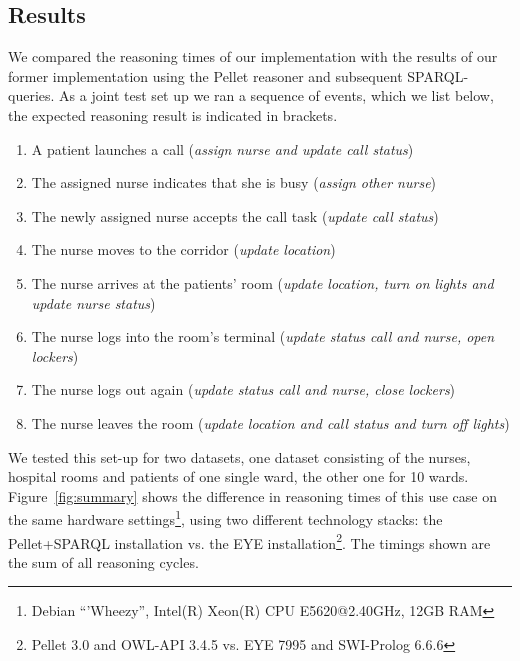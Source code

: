 \subsection{Results}\label{ev}


We compared the reasoning times of our implementation with the results of our former implementation using 
the Pellet reasoner and subsequent SPARQL-queries. 
As a joint test set up we ran a sequence of events, which we list below, the expected reasoning result is indicated in brackets. 

\begin{enumerate}
\item %
A patient launches a call (\emph{assign nurse and update call status})
\item
The assigned nurse indicates that she is busy (\emph{assign other nurse})
\item
The newly assigned nurse accepts the call task (\emph{update call status})
\item %
The nurse moves to the corridor (\emph{update location})
\item %
The nurse arrives at the patients' room (\emph{update location, turn on lights  and update nurse status})
\item %
The nurse logs into the room's terminal (\emph{update status call and nurse, open lockers})
\item %
The nurse logs out again (\emph{update status call and nurse, close lockers})
\item %
The nurse leaves the room (\emph{update location and call status and turn off lights})
\end{enumerate}

We tested this set-up for two datasets, one dataset consisting of the nurses, hospital rooms and patients of one single ward, the other one for 10 wards.
Figure~\ref{fig:summary} shows the difference in reasoning times of this use case on the same hardware settings\footnote{Debian ``'Wheezy'', Intel(R) Xeon(R) CPU E5620@2.40GHz, 12GB RAM}, using two different technology stacks: the Pellet+SPARQL installation vs. the EYE installation\footnote{Pellet 3.0 and OWL-API 3.4.5 vs. EYE 7995 and SWI-Prolog 6.6.6}.
The timings shown are the sum of all reasoning cycles.

